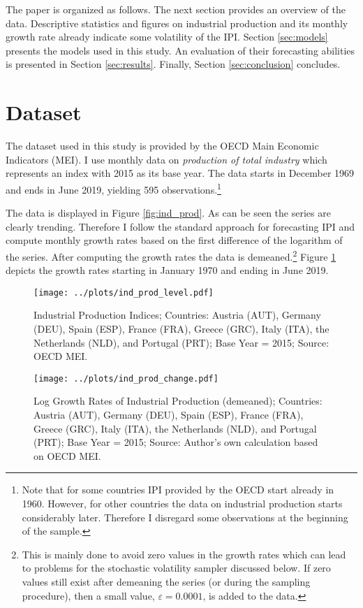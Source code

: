 \documentclass[12pt,letterpaper,fleqn]{article}           %
\begin{document}
The paper is organized as follows. The next section provides an overview of the data. Descriptive statistics and figures on industrial production and its monthly growth rate already indicate some volatility of the IPI. Section \ref{sec:models} presents the models used in this study. An evaluation of their forecasting abilities is presented in Section \ref{sec:results}. Finally, Section \ref{sec:conclusion} concludes.

\section{Dataset}
\label{sec:data}

The dataset used in this study is provided by the OECD Main Economic Indicators (MEI). I use monthly data on \textit{production of total industry} which represents an index with 2015 as its base year. The data starts in December 1969 and ends in June 2019, yielding 595 observations.\footnote{Note that for some countries IPI provided by the OECD start already in 1960. However, for other countries the data on industrial production starts considerably later. Therefore I disregard some observations at the beginning of the sample.} 

The data is displayed in Figure \ref{fig:ind_prod}. As can be seen the series are clearly trending. Therefore I follow the standard approach for forecasting IPI and compute monthly growth rates based on the first difference of the logarithm of the series. After computing the growth rates the data is demeaned.\footnote{This is mainly done to avoid zero values in the growth rates which can lead to problems for the stochastic volatility sampler discussed below. If zero values still exist after demeaning the series (or during the sampling procedure), then a small value, $\varepsilon = 0.0001$, is added to the data.} Figure \ref{fig:ind_prod_growth} depicts the growth rates starting in January 1970 and ending in June 2019. 

\begin{figure}
\centering \texttt{[image: ../plots/ind\_prod\_level.pdf]} 
\caption{Industrial Production Indices; Countries: Austria (AUT), Germany (DEU), Spain (ESP), France (FRA), Greece (GRC), Italy (ITA), the Netherlands (NLD), and Portugal (PRT); Base Year = 2015; Source: OECD MEI.}
\label{fig:ind_prod} 

\centering \texttt{[image: ../plots/ind\_prod\_change.pdf]} 
\caption{Log Growth Rates of Industrial Production (demeaned); Countries: Austria (AUT), Germany (DEU), Spain (ESP), France (FRA), Greece (GRC), Italy (ITA), the Netherlands (NLD), and Portugal (PRT); Base Year = 2015; Source: Author's own calculation based on OECD MEI.}
\label{fig:ind_prod_growth} 
\end{figure}
\end{document}
